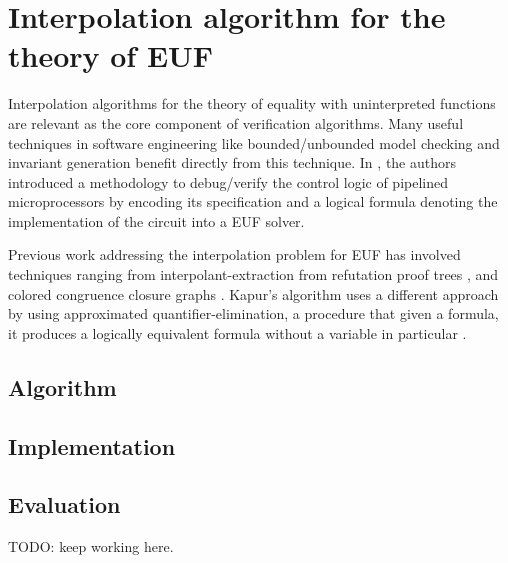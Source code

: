 \chapter{Interpolation algorithm for the theory of EUF}

Interpolation algorithms for the theory of equality 
with uninterpreted functions are relevant as the core 
component of verification algorithms. Many useful techniques 
in software engineering like bounded/unbounded model 
checking and invariant generation benefit directly from 
this technique. In \cite{10.1007/3-540-58179-0_44}, the 
authors introduced a methodology to debug/verify the 
control logic of pipelined microprocessors by encoding 
its specification and a logical formula denoting the 
implementation of the circuit into a EUF solver.

Previous work addressing the interpolation problem for 
EUF has involved techniques ranging from
interpolant-extraction from refutation proof 
trees \cite{10.1007/978-3-540-24730-2_2, mcmillan2011interpolants, 
10.1007/978-3-642-31612-8_24}, and colored congruence closure
graphs \cite{10.1007/978-3-642-00768-2_34}. Kapur's algorithm 
uses a different approach by using approximated
quantifier-elimination, a procedure that given a formula, 
it produces a logically equivalent formula
 without a variable in particular \cite{DBLP:books/daglib/0076838}.

\section{Algorithm}



%

\section{Implementation}



\section{Evaluation}

TODO: keep working here.

